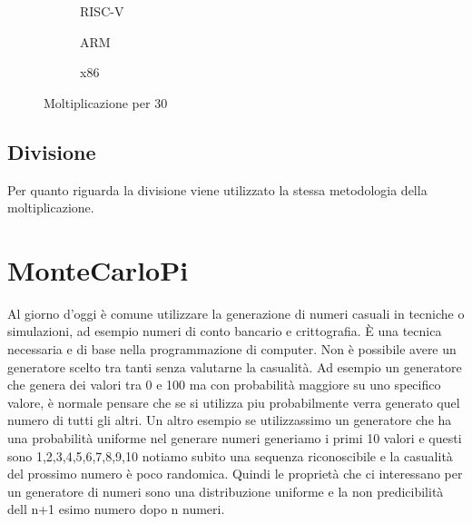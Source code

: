 \documentclass[12pt,a4paper]{report}
\begin{document}
\begin{figure}

     \begin{subfigure}[b]{0.3\textwidth}
  
        
         \label{Code:Mul30RISC}
	\caption{RISC-V}

     \end{subfigure}
     \hfill
     \begin{subfigure}[b]{0.3\textwidth}
         
          	
		\caption{ARM}
		 \label{Code:Mul30ARM}
     \end{subfigure}
     \hfill
     \begin{subfigure}[b]{0.3\textwidth}
         
          
	 \caption{x86}
	 \label{Code:Mul30X86}
     \end{subfigure}
     \caption{Moltiplicazione per 30}
     \end{figure}

\vspace{2cm}

\subsection{Divisione}

Per quanto riguarda la divisione viene utilizzato la stessa metodologia della moltiplicazione.




\section{MonteCarloPi}
Al giorno d'oggi è comune utilizzare la generazione di numeri casuali in tecniche o simulazioni, ad esempio numeri di conto bancario e crittografia. È una tecnica necessaria e di base nella programmazione di computer. Non è possibile avere un generatore scelto tra tanti senza valutarne la casualità. Ad esempio un generatore che genera dei valori tra 0 e 100 ma con probabilità maggiore su uno specifico valore, è normale pensare che se si utilizza piu probabilmente verra generato quel numero di tutti gli altri. Un altro esempio se utilizzassimo un generatore che ha  una probabilità uniforme nel generare numeri  generiamo i primi 10 valori e questi sono 1,2,3,4,5,6,7,8,9,10 notiamo subito una sequenza riconoscibile e la casualità del prossimo numero è poco randomica.
Quindi le proprietà che ci interessano per un generatore di numeri sono una distribuzione uniforme e la non predicibilità dell n+1 esimo numero dopo n numeri.
\end{document}
